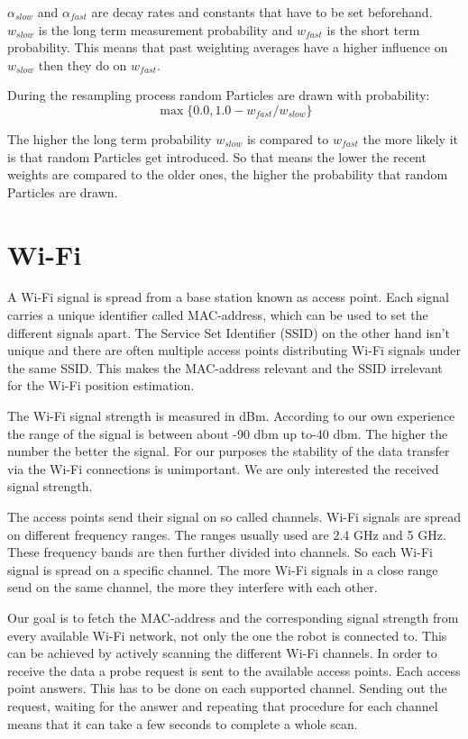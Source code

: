 $\alpha_{slow}$ and $\alpha_{fast}$ are decay rates and constants that have to be set beforehand. $w_{slow}$ is the long term measurement probability and $w_{fast}$ is the short term probability. This means that past weighting averages have a higher influence on $w_{slow}$ then they do on $w_{fast}$. 

During the resampling process random \gls{Particle}s are drawn with probability:
\begin{equation}\label{eq:quality}
\max\{0.0, 1.0-w_{fast}/w_{slow}\}
\end{equation}

The higher the long term probability $w_{slow}$ is compared to $w_{fast}$ the more likely it is that random \gls{Particle}s get introduced. So that means the lower the recent weights are compared to the older ones, the higher the probability that random \gls{Particle}s are drawn\citep[p. 258-259]{Thrun:2005:PR:1121596}.
\section{Wi-Fi}\label{sec:wifi}
A Wi-Fi signal is spread from a base station known as access point. Each signal carries a unique identifier called \Gls{MAC-address}, which can be used to set the different signals apart. The Service Set Identifier (\Gls{SSID}) on the other hand isn't unique and there are often multiple access points distributing Wi-Fi signals under the same \Gls{SSID}. This makes the \Gls{MAC-address} relevant and the \Gls{SSID} irrelevant for the Wi-Fi position estimation\citep{ieee802.11-2012}.

The Wi-Fi signal strength is measured in dBm. According to our own experience the range of the signal is between about -90 dbm up to-40 dbm. The higher the number the better the signal. For our purposes the stability of the data transfer via the Wi-Fi connections is unimportant. We are only interested the received signal strength.

The access points send their signal on so called channels. Wi-Fi signals are spread on different frequency ranges. The ranges usually used are 2.4 GHz and 5 GHz. These frequency bands are then further divided into channels. So each Wi-Fi signal is spread on a specific channel. The more Wi-Fi signals in a close range send on the same channel, the more they interfere with each other. 

Our goal is to fetch the MAC-address and the corresponding signal strength from every available Wi-Fi network, not only the one the robot is connected to. This can be achieved by actively scanning the different Wi-Fi channels. In order to receive the data a probe request is sent to the available access points. Each access point answers. This has to be done on each supported channel. Sending out the request, waiting for the answer and repeating that procedure for each channel means that it can take a few seconds to complete a whole scan. 

